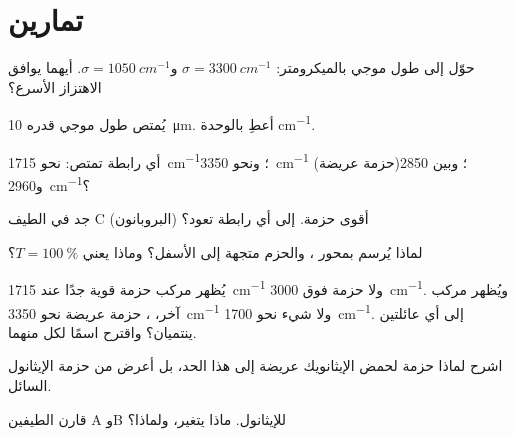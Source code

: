 \section{تمارين}

\begin{exercise}[$\star$]\label{exo:g11:infrared:1}
حوّل إلى طول موجي بالميكرومتر: $\sigma = \qty{3300}{cm^{-1}}$
و$\sigma = \qty{1050}{cm^{-1}}$. أيهما يوافق الاهتزاز
الأسرع؟
\end{exercise}

\begin{exercise}[$\star$]\label{exo:g11:infrared:2}
يُمتص طول موجي قدره \qty{10}{\micro m}. أعطِ 
بالوحدة \si{cm^{-1}}.
\end{exercise}

\begin{exercise}[$\star$]\label{exo:g11:infrared:3}
أي رابطة تمتص: نحو \qty{1715}{cm^{-1}}؛ ونحو \qty{3350}{cm^{-1}}
(حزمة عريضة)؛ وبين 2850 و\qty{2960}{cm^{-1}}؟
\end{exercise}

\begin{exercise}[$\star$]\label{exo:g11:infrared:4}
جد في الطيف C (البروبانون) أقوى حزمة. إلى أي رابطة
تعود؟
\end{exercise}

\begin{exercise}[$\star$]\label{exo:g11:infrared:5}
لماذا يُرسم  بمحور ، والحزم متجهة
إلى الأسفل؟ وماذا يعني $T = \qty{100}{\percent}$؟
\end{exercise}

\begin{exercise}[$\star\star$]\label{exo:g11:infrared:6}
يُظهر مركب  حزمة قوية جدًا عند
\qty{1715}{cm^{-1}} ولا حزمة فوق \qty{3000}{cm^{-1}}. ويُظهر مركب آخر،
، حزمة عريضة نحو \qty{3350}{cm^{-1}} ولا شيء نحو
\qty{1700}{cm^{-1}}. إلى أي عائلتين ينتميان؟ واقترح اسمًا
لكل منهما.
\end{exercise}

\begin{exercise}[$\star\star$]\label{exo:g11:infrared:7}
اشرح لماذا حزمة  لحمض الإيثانويك عريضة إلى هذا الحد، بل أعرض
من حزمة الإيثانول السائل.
\end{exercise}

\begin{exercise}[$\star\star$]\label{exo:g11:infrared:8}
قارن الطيفين A وB للإيثانول. ماذا يتغير، ولماذا؟
\end{exercise}

